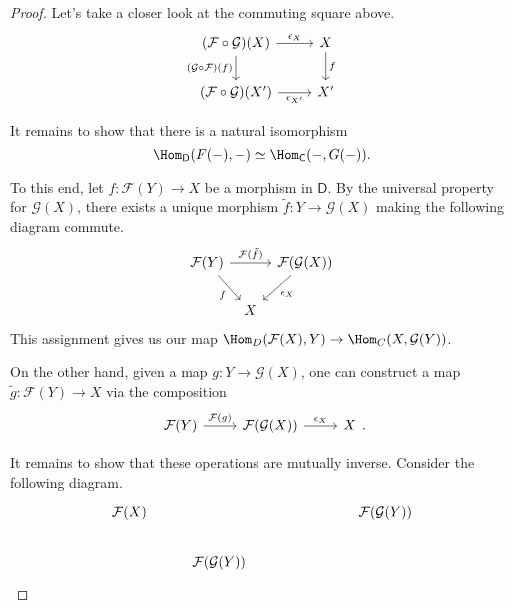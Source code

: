 \documentclass[main.tex]{subfiles}
\begin{document}
\begin{proof}
  Let's take a closer look at the commuting square above.
  \begin{equation*}
    \begin{tikzcd}
      (\mathcal{F} \circ \mathcal{G})(X)
      \arrow[r, "\epsilon_{X}"]
      \arrow[d, swap, "(\mathcal{G} \circ \mathcal{F})(f)"]
      & X
      \arrow[d, "f"]
      \\
      (\mathcal{F} \circ \mathcal{G})(X')
      \arrow[r, swap, "\epsilon_{X'}"]
      & X'
    \end{tikzcd}
  \end{equation*}

  It remains to show that there is a natural isomorphism
  \begin{equation*}
    \Hom_{\mathsf{D}}(F(-), -) \simeq \Hom_{\mathsf{C}}(-, G(-)).
  \end{equation*}

  To this end, let $f\colon \mathcal{F}(Y) \to X$ be a morphism in $\mathsf{D}$. By the universal property for $\mathcal{G}(X)$, there exists a unique morphism $\tilde{f}\colon Y \to \mathcal{G}(X)$ making the following diagram commute.
  \begin{equation*}
    \begin{tikzcd}[column sep=tiny]
      \mathcal{F}(Y)
      \arrow[dr, swap, "f"]
      \arrow[rr, "\mathcal{F}(\tilde{f})"]
      && \mathcal{F}(\mathcal{G}(X))
      \arrow[dl, "\epsilon_{X}"]
      \\
      & X
    \end{tikzcd}
  \end{equation*}
  This assignment gives us our map $\Hom_{D}(\mathcal{F}(X), Y) \to \Hom_{C}(X, \mathcal{G}(Y))$.

  On the other hand, given a map $g\colon Y \to \mathcal{G}(X)$, one can construct a map $\tilde{g}\colon \mathcal{F}(Y) \to X$ via the composition
  \begin{equation*}
    \begin{tikzcd}
      \mathcal{F}(Y)
      \arrow[r, "\mathcal{F}(g)"]
      & \mathcal{F}(\mathcal{G}(X))
      \arrow[r, "\epsilon_{X}"]
      & X
    \end{tikzcd}.
  \end{equation*}

  It remains to show that these operations are mutually inverse. Consider the following diagram.
  \begin{equation*}
    \begin{tikzcd}
      \mathcal{F}(X)
      &&&& \mathcal{F}(\mathcal{G}(Y))
      \\
      & \mathcal{F}(\mathcal{G}(Y))
    \end{tikzcd}
  \end{equation*}
\end{proof}
\end{document}
